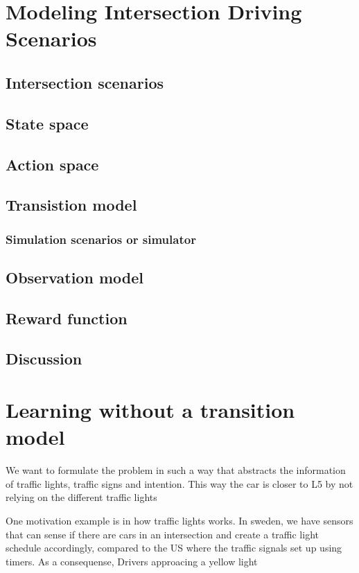 \chapter{Modeling Intersection Driving Scenarios}
\label{ch:modeling_intersection}
\section{Intersection scenarios}
\section{State space}
\section{Action space}
\section{Transistion model}
\subsection{Simulation scenarios or simulator}
\section{Observation model}
\section{Reward function}
\section{Discussion}




\chapter{Learning without a transition model}
We want to formulate the problem in such a way that abstracts the information of traffic lights, traffic signs and intention. This way the car is closer to L5 by not relying on the different traffic lights

One motivation example is in how traffic lights works. In sweden, we have sensors that can sense if there are cars in an intersection and create a traffic light schedule accordingly, compared to the US where the traffic signals set up using timers. As a consequense, Drivers approacing a yellow light 

